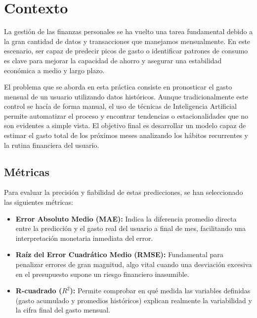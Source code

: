 \section{Contexto}
La gestión de las finanzas personales se ha vuelto una tarea fundamental debido a la gran cantidad de datos y transacciones que manejamos mensualmente. En este escenario, ser capaz de predecir picos de gasto o identificar patrones de consumo es clave para mejorar la capacidad de ahorro y asegurar una estabilidad económica a medio y largo plazo.

El problema que se aborda en esta práctica consiste en pronosticar el gasto mensual de un usuario utilizando datos históricos. Aunque tradicionalmente este control se hacía de forma manual, el uso de técnicas de Inteligencia Artificial permite automatizar el proceso y encontrar tendencias o estacionalidades que no son evidentes a simple vista. El objetivo final es desarrollar un modelo capaz de estimar el gasto total de los próximos meses analizando los hábitos recurrentes y la rutina financiera del usuario.

\subsection{Métricas}

Para evaluar la precisión y fiabilidad de estas predicciones, se han seleccionado las siguientes métricas:
\begin{itemize}
    \item \textbf{Error Absoluto Medio (MAE):} Indica la diferencia promedio directa entre la predicción y el gasto real del usuario a final de mes, facilitando una interpretación monetaria inmediata del error.
    \item \textbf{Raíz del Error Cuadrático Medio (RMSE):} Fundamental para penalizar errores de gran magnitud, algo vital cuando una desviación excesiva en el presupuesto supone un riesgo financiero inasumible.
    \item \textbf{R-cuadrado ($R^2$):} Permite comprobar en qué medida las variables definidas (gasto acumulado y promedios históricos) explican realmente la variabilidad y la cifra final del gasto mensual.
\end{itemize}
